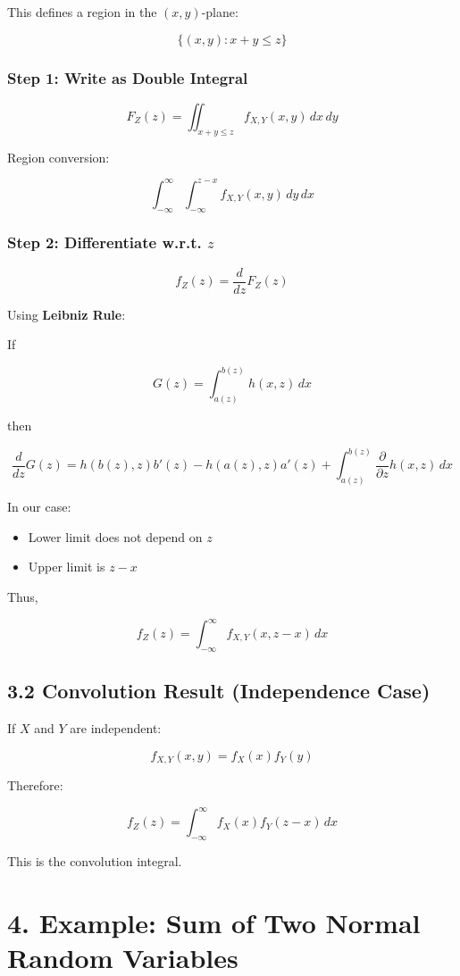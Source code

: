 \documentclass[12pt]{article}
\begin{document}
This defines a region in the $(x,y)$-plane:

\[
\{(x,y) : x+y \le z\}
\]

\subsubsection*{Step 1: Write as Double Integral}

\[
F_Z(z)
=
\iint_{x+y \le z}
f_{X,Y}(x,y) \, dx \, dy
\]

Region conversion:

\[
\int_{-\infty}^{\infty}
\int_{-\infty}^{z-x}
f_{X,Y}(x,y)
\, dy \, dx
\]

\subsubsection*{Step 2: Differentiate w.r.t. $z$}

\[
f_Z(z) = \frac{d}{dz} F_Z(z)
\]

Using \textbf{Leibniz Rule}:

If

\[
G(z) = \int_{a(z)}^{b(z)} h(x,z) \, dx
\]

then

\[
\frac{d}{dz}G(z)
=
h(b(z),z)b'(z)
-
h(a(z),z)a'(z)
+
\int_{a(z)}^{b(z)}
\frac{\partial}{\partial z} h(x,z) \, dx
\]

In our case:

\begin{itemize}
\item Lower limit does not depend on $z$
\item Upper limit is $z-x$
\end{itemize}

Thus,

\[
f_Z(z)
=
\int_{-\infty}^{\infty}
f_{X,Y}(x, z-x) \, dx
\]

\subsection*{3.2 Convolution Result (Independence Case)}

If $X$ and $Y$ are independent:

\[
f_{X,Y}(x,y) = f_X(x) f_Y(y)
\]

Therefore:

\[
\boxed{
f_Z(z)
=
\int_{-\infty}^{\infty}
f_X(x) f_Y(z-x) \, dx
}
\]

This is the convolution integral.

\section*{4. Example: Sum of Two Normal Random Variables}
\end{document}
